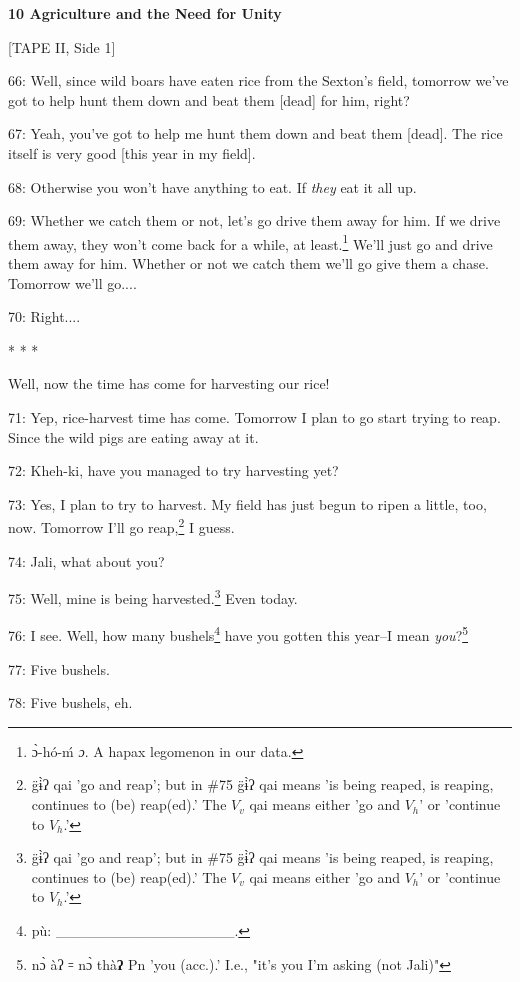 
\textbf{10 Agriculture and the Need for Unity}

[TAPE II, Side 1]

66: Well, since wild boars have eaten rice from the Sexton's field,  tomorrow we've
got to help hunt them down and beat them [dead] for him, right?

67: Yeah, you've got to help me hunt them down and beat them [dead]. The rice itself
is very good [this year in my field].

68: Otherwise you won't have anything to eat. If \textit{they} eat it all up.

69: Whether we catch them or not, let's go drive them away for him. If we drive
them away, they won't come back for a while, at least.\footnote{ɔ̀-hó-ḿ \emph{ɔ}. A hapax legomenon in our data.} We'll just go and drive
them away for him. Whether or not we catch them we'll go give them a chase. Tomorrow
we'll go....

70: Right....

\begin{center}
* * *
\end{center}

\leftskip=0pt
Well, now the time has come for harvesting our rice!

71: Yep, rice-harvest time has come. Tomorrow I plan to go start trying to reap.
Since the wild pigs are eating away at it.

72: Kheh-ki, have you managed to try harvesting yet?

73: Yes, I plan to try to harvest. My field has just begun to ripen a little, too,
now. Tomorrow I'll go reap,\footnote{g̈ɨ̀ʔ qai 'go and reap'; but in \#75 g̈ɨ̀ʔ qai means 'is being reaped, is reaping, continues to (be) reap(ed).' The $V_v$ qai means either 'go and $V_h$' or 'continue to $V_h$.'} I guess.

74: Jali, what about you?

75: Well, mine is being harvested.\footnote{g̈ɨ̀ʔ qai 'go and reap'; but in \#75 g̈ɨ̀ʔ qai means 'is being reaped, is reaping, continues to (be) reap(ed).' The $V_v$ qai means either 'go and $V_h$' or 'continue to $V_h$.'} Even today.

76: I see. Well, how many bushels\footnote{pù: \_\_\_\_\_\_\_\_\_\_\_\_\_\_\_\_\_.} have you gotten this year--I mean \emph{you}?\footnote{nɔ̀ àʔ ꞊ nɔ̀ thà\textbf{ʔ} Pn 'you (acc.).' I.e., "it's you I'm asking (not Jali)"}

77: Five bushels.

78: Five bushels, eh.


